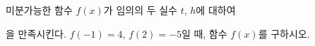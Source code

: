 미분가능한 함수 $f(x)$가 임의의 두 실수 $t$, $h$에 대하여\par\smallskip{}\par\smallskip\noindent 을 만족시킨다. $f(-1)=4$, $f(2)=-5$일 때, 함수 $f(x)$를 구하시오. 
